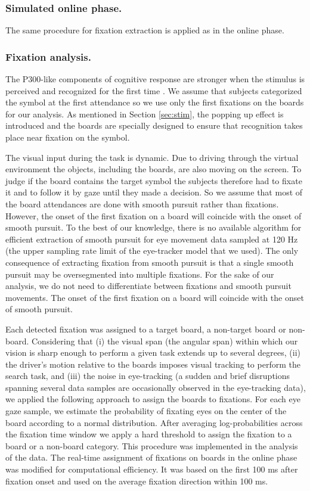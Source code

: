 \documentclass[12pt]{iopart}
\begin{document}
\subsubsection*{Simulated online phase.}
The same procedure for fixation extraction is applied as in the online phase.

\subsubsection*{Fixation analysis.}
\label{sec:fixanal}
The P300-like components of cognitive response are stronger when the stimulus is perceived and recognized
for the first time \cite{devillez_p300_2015}. 
We assume that subjects categorized the symbol at the first
attendance so we use only the first fixations on the boards for our analysis.
As mentioned in Section \ref{sec:stim}, the popping up effect is introduced 
and the boards are specially designed to ensure that
recognition takes place near fixation on the symbol.

The visual input during the task is dynamic. Due to driving through
the virtual environment the objects, including the boards, are also moving on the screen. To judge if the board contains the target symbol the subjects therefore had to fixate it and to follow it by gaze until they made a decision.
So we assume that most of the board attendances are done with
smooth pursuit rather than fixations. However, the onset of the first fixation on a board will coincide with the onset of smooth pursuit.
To the best of our knowledge, there is no available algorithm for efficient
extraction of smooth pursuit for eye movement data sampled at 120 Hz (the upper sampling rate limit of the eye-tracker model that we used). The only consequence of 
extracting fixation from smooth pursuit is that a single smooth pursuit
may be oversegmented into multiple fixations.
For the sake of our analysis, we do not need to differentiate between
fixations and smooth pursuit movements. The onset of the first fixation on a board
will coincide with the onset of smooth pursuit.

Each detected fixation was assigned to a target board, a non-target board or non-board.
Considering that (i) the visual span (the angular span) within which our vision is sharp enough to perform a given task extends up to several degrees, (ii) the driver's motion relative to the boards imposes visual tracking to perform the search task, and (iii) the noise in eye-tracking (a sudden and brief disruptions spanning several data samples are occasionally observed in the eye-tracking data), we applied the following approach to assign the boards to fixations. For each eye gaze sample, we estimate the probability of
fixating eyes on the center of the board according to a normal distribution.
After averaging log-probabilities across the fixation time window we apply a hard
threshold to assign the fixation to a board or a non-board category.
This procedure was implemented in the analysis of the data.
The real-time assignment of fixations on boards in the online phase was
modified for computational efficiency. It was based
on the first 100 ms after fixation onset and
used on the average fixation direction within 100 ms.
\end{document}

